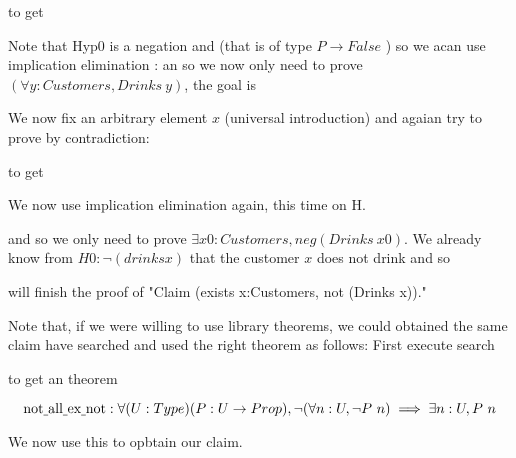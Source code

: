 to get 


Note that Hyp0 is a negation and (that is of type $P\rightarrow False$ ) so we acan use implication elimination
:
an so we now only need to prove $(\forall y : Customers, Drinks\ y)$, the goal is
 
 We now fix an arbitrary element $x$ (universal introduction) and agaian try to prove by contradiction:
 

to get 



We now use implication elimination again, this time on H.


and so we only need to prove $\exists x0 : Customers, neg (Drinks \ x0)$. We already know from $H0:\neg(drinks x)$ that the customer $x$ does not drink and so

will finish the proof of "Claim (exists x:Customers, not (Drinks x))."


Note that, if we were willing to use library theorems, we could obtained the same claim have searched and used  the right theorem as follows:
First execute search



to get an theorem

$$\text{not\underline{ }all\underline{ }ex\underline{ }not}:
  \forall (U : Type) (P : U \rightarrow Prop), \neg (\forall n : U, \neg P\  n) \implies \exists n : U, P \ n$$

We now use this to opbtain our claim.


